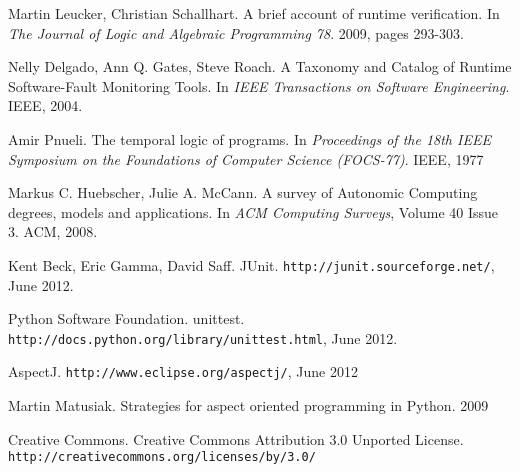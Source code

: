 \documentclass[a4paper,11pt]{article}
\begin{document}
\begin{thebibliography}{9}

	Martin Leucker, Christian Schallhart.
	A brief account of runtime verification.
	In \emph{The Journal of Logic and Algebraic Programming 78}.
	2009, pages 293-303.

	Nelly Delgado, Ann Q. Gates, Steve Roach.
	A Taxonomy and Catalog of Runtime Software-Fault Monitoring Tools.
	In \emph{IEEE Transactions on Software Engineering}.
	IEEE, 2004.

	Amir Pnueli.
	The temporal logic of programs. 
	In \emph{Proceedings of the 18th IEEE Symposium on the Foundations of Computer Science (FOCS-77)}.
	IEEE, 1977

	Markus C. Huebscher, Julie A. McCann.
	A survey of Autonomic Computing \- degrees, models and applications.
	In \emph{ACM Computing Surveys}, Volume 40 Issue 3.
	ACM, 2008.
	
	Kent Beck, Eric Gamma, David Saff.
	JUnit.
	\texttt{http://junit.sourceforge.net/},
	June 2012.

	Python Software Foundation.
	unittest.
	\texttt{http://docs.python.org/library/unittest.html},
	June 2012.

	AspectJ.
	\texttt{http://www.eclipse.org/aspectj/},
	June 2012

	Martin Matusiak.
	Strategies for aspect oriented programming in Python.
	2009

	Creative Commons.
	Creative Commons Attribution 3.0 Unported License.
	\texttt{http://creativecommons.org/licenses/by/3.0/}

\end{thebibliography}
\end{document}
